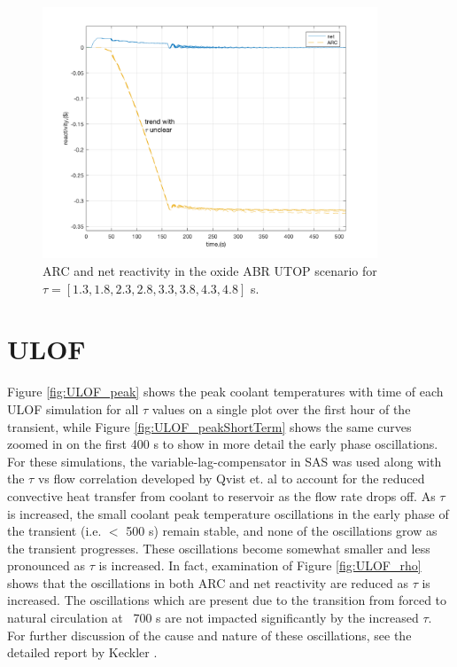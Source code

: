 \documentclass[11pt, oneside]{article}   	%
\begin{document}
\begin{figure}[h!]
\includegraphics[width=10cm]{UTOP_rho}
\centering
\caption{ARC and net reactivity in the oxide ABR UTOP scenario for $\tau=[1.3, 1.8, 2.3, 2.8, 3.3, 3.8, 4.3, 4.8]$ s.}
\label{fig:UTOP_rho}
\end{figure}

\section{ULOF}
Figure \ref{fig:ULOF_peak} shows the peak coolant temperatures with time of each ULOF simulation for all $\tau$ values on a single plot over the first hour of the transient, while Figure \ref{fig:ULOF_peakShortTerm} shows the same curves zoomed in on the first 400 s to show in more detail the early phase oscillations.
For these simulations, the variable-lag-compensator in SAS was used along with the $\tau$ vs flow correlation developed by Qvist et. al \cite{1stARC_paper} to account for the reduced convective heat transfer from coolant to reservoir as the flow rate drops off.
As $\tau$ is increased, the small coolant peak temperature oscillations in the early phase of the transient (i.e. $<$ 500 s) remain stable, and none of the oscillations grow as the transient progresses. 
These oscillations become somewhat smaller and less pronounced as $\tau$ is increased.
In fact, examination of Figure \ref{fig:ULOF_rho} shows that the oscillations in both ARC and net reactivity are reduced as $\tau$ is increased.
The oscillations which are present due to the transition from forced to natural circulation at ~700 s are not impacted significantly by the increased $\tau$.
For further discussion of the cause and nature of these oscillations, see the detailed report by Keckler \cite{ULOF_oscillationsReport}.
\end{document}

